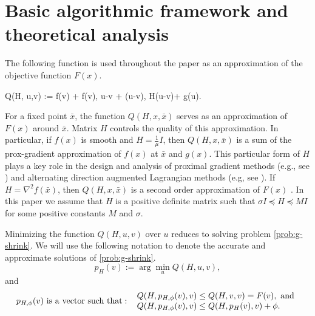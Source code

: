 \documentclass[11pt]{article}
\numberwithin{equation}{section}
\begin{document}





\section{Basic algorithmic framework and theoretical analysis}\label{sec:basic} 

The following function is used throughout the paper as an approximation of the objective function $F(x)$.

\bea \label{def-Qf}
Q(H, u,v) := f(v) +
\langle \nabla f(v),  u-v \rangle +  \langle (u-v), H(u-v)\rangle + g(u).
\eea 


%
For a fixed point $\bar x$, the function $Q(H,  x, \bar x)$ serves as an approximation of $F(x)$ around  $\bar x$. 
Matrix $H$ controls the quality of this approximation. In particular, if $f(x)$ is smooth  and  $H=\frac{1}{\mu}I$, then $Q(H, x , \bar x)$ is a sum of the prox-gradient approximation of $f(x)$ at $\bar x$ and $g(x)$. This particular form of $H$ plays a key role in the design and analysis of proximal gradient methods (e.g., see  \cite{Beck2009}) 
and alternating direction augmented Lagrangian methods (e.g, see \cite{Alm_Scheinberg}).
 If  $H=\nabla^2 f(\bar x)$, then  $Q(H, x ,\bar x)$
is a second order approximation of $F(x)$  \cite{Saundersetal, SchmidtQP}.
In this paper we assume that  $H$ is a positive definite matrix such that $\sigma I \preceq H\preceq M I$ for some positive constants $M$ and $\sigma$. 

Minimizing the function $Q(H, u,v)$ over $u$ reduces to solving problem \eqref{prob:g-shrink}. We will use the following notation to denote the accurate and approximate solutions of \eqref{prob:g-shrink}.
\begin{equation}\label{eq:pv}
p_H(v):=\arg\min_u Q(H, u,v),  
\end{equation}
and 
\begin{equation}\label{eq:pvphi}
p_{H, \phi}(v) {\rm \ is \ a\ vector\ such\ that:\ } \  \begin{array}{l}  Q(H, p_{H, \phi}(v),v)\leq Q(H, v,v)=F(v),\ {\rm and }\\
Q(H, p_{H, \phi}(v),v)\leq Q(H, p_{H}(v),v)+\phi. \end{array}
\end{equation}
\end{document}
